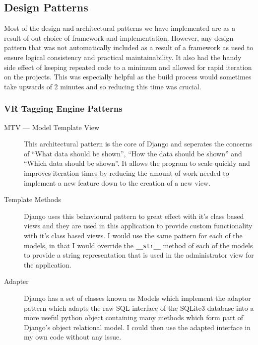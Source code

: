 \documentclass[12pt]{report}
\newcommand{\inlinecode}{\texttt}
\begin{document}
\subsection{Design Patterns}

Most of the design and architectural patterns we have implemented are as a result of out choice of framework and implementation. However, any design pattern that was not automatically included as a result of a framework as used to ensure logical consistency and practical maintainability. It also had the handy side effect of keeping repeated code to a minimum and allowed for rapid iteration on the projects. This was especially helpful as the build process would sometimes take upwards of 2 minutes and so reducing this time was crucial.

\subsubsection{VR Tagging Engine Patterns}
\begin{description}
 \item [MTV --- Model Template View] This architectural pattern is the core of Django and seperates the concerns of ``What data should be shown'', ``How the data should be shown'' and ``Which data should be shown''. It allows the program to scale quickly and improves iteration times by reducing the amount of work needed to implement a new feature down to the creation of a new view.

 \item [Template Methods] Django uses this behavioural pattern to great effect with it's class based views and they are used in this application to provide custom functionality with it's class based views. I would use the same pattern for each of the models, in that I would override the \inlinecode{\_\_str\_\_} method of each of the models to provide a string representation that is used in the administrator view for the application.

 \item [Adapter] Django has a set of classes known as Models which implement the adaptor pattern which adapts the raw SQL interface of the SQLite3 database into a more useful python object containing many methods which form part of Django's object relational model. I could then use the adapted interface in my own code without any issue.
\end{description}
\end{document}
